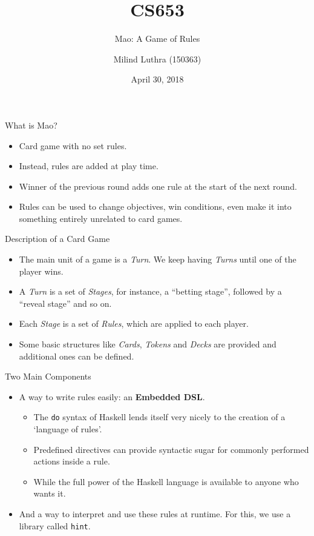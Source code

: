\documentclass[pdf]{beamer}
\title{CS653}
\subtitle{Mao: A Game of Rules}
\author[Milind Luthra]{Milind Luthra (150363)}
\date{April 30, 2018}
\begin{document}
\begin{frame}
  \titlepage
\end{frame}

\begin{frame}{What is Mao?}
  \begin{itemize}
  \item <1-> Card game with no set rules.
  \item <2-> Instead, rules are added at play time.
  \item <3-> Winner of the previous round adds one rule at the start of the next round.
  \item <4-> Rules can be used to change objectives, win conditions, even make it into something entirely unrelated to card games.
  \end{itemize}
\end{frame}

\begin{frame}{Description of a Card Game}
  \begin{itemize}
  \item <1-> The main unit of a game is a \textit{Turn}. We keep having \textit{Turns} until one of the player wins.
  \item <2-> A \textit{Turn} is a set of \textit{Stages}, for instance, a ``betting stage'', followed by a ``reveal stage'' and so on.
  \item <3-> Each \textit{Stage} is a set of \textit{Rules}, which are applied to each player.
  \item <4-> Some basic structures like \textit{Cards}, \textit{Tokens} and \textit{Decks} are provided and additional ones can be defined.
  \end{itemize}
\end{frame}

\begin{frame}{Two Main Components}
  \begin{itemize}
  \item <1-> A way to write rules easily: an \textbf{Embedded DSL}.
    \begin{itemize}
    \item <2-> The \texttt{do} syntax of Haskell lends itself very nicely to the creation of a `language of rules'.
    \item <3-> Predefined directives can provide syntactic sugar for commonly performed actions inside a rule.
      \item <4-> While the full power of the Haskell language is available to anyone who wants it.
      \end{itemize}
    \item <5-> And a way to interpret and use these rules at runtime. For this, we use a library called \texttt{hint}.
  \end{itemize}
\end{frame}
\end{document}

